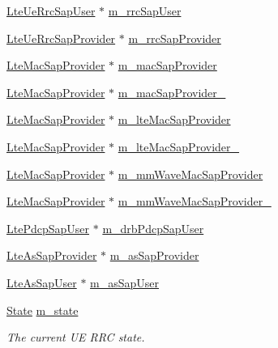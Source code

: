 \begin{DoxyCompactItemize}
\item 
\hyperlink{classns3_1_1LteUeRrcSapUser}{Lte\+Ue\+Rrc\+Sap\+User} $\ast$ \hyperlink{classns3_1_1LteUeRrc_a9636e38d20aa1d75c9423d43648f2a1a}{m\+\_\+rrc\+Sap\+User}
\item 
\hyperlink{classns3_1_1LteUeRrcSapProvider}{Lte\+Ue\+Rrc\+Sap\+Provider} $\ast$ \hyperlink{classns3_1_1LteUeRrc_a390a2ddfeab3abe021bbc35ad911d066}{m\+\_\+rrc\+Sap\+Provider}
\item 
\hyperlink{classns3_1_1LteMacSapProvider}{Lte\+Mac\+Sap\+Provider} $\ast$ \hyperlink{classns3_1_1LteUeRrc_a194a22ce682adab02b0e9d2fc71fda48}{m\+\_\+mac\+Sap\+Provider}
\item 
\hyperlink{classns3_1_1LteMacSapProvider}{Lte\+Mac\+Sap\+Provider} $\ast$ \hyperlink{classns3_1_1LteUeRrc_a78400536170ecae9893d5ae8c50bf069}{m\+\_\+mac\+Sap\+Provider\+\_}
\item 
\hyperlink{classns3_1_1LteMacSapProvider}{Lte\+Mac\+Sap\+Provider} $\ast$ \hyperlink{classns3_1_1LteUeRrc_a6eecd6eff45a1d5b9d783ffd1e5d099c}{m\+\_\+lte\+Mac\+Sap\+Provider}
\item 
\hyperlink{classns3_1_1LteMacSapProvider}{Lte\+Mac\+Sap\+Provider} $\ast$ \hyperlink{classns3_1_1LteUeRrc_a183748045145f6f225e4dd2d20e08dee}{m\+\_\+lte\+Mac\+Sap\+Provider\+\_}
\item 
\hyperlink{classns3_1_1LteMacSapProvider}{Lte\+Mac\+Sap\+Provider} $\ast$ \hyperlink{classns3_1_1LteUeRrc_ace6035d94d2a6fb838f107450d49b373}{m\+\_\+mm\+Wave\+Mac\+Sap\+Provider}
\item 
\hyperlink{classns3_1_1LteMacSapProvider}{Lte\+Mac\+Sap\+Provider} $\ast$ \hyperlink{classns3_1_1LteUeRrc_a0df418b8b1c9be4267f5b56d904ba841}{m\+\_\+mm\+Wave\+Mac\+Sap\+Provider\+\_}
\item 
\hyperlink{classns3_1_1LtePdcpSapUser}{Lte\+Pdcp\+Sap\+User} $\ast$ \hyperlink{classns3_1_1LteUeRrc_a6f2505a766e5a391d82170ebff83a9c2}{m\+\_\+drb\+Pdcp\+Sap\+User}
\item 
\hyperlink{classns3_1_1LteAsSapProvider}{Lte\+As\+Sap\+Provider} $\ast$ \hyperlink{classns3_1_1LteUeRrc_a8a7481a9bd77073e93fe21c545bd0a25}{m\+\_\+as\+Sap\+Provider}
\item 
\hyperlink{classns3_1_1LteAsSapUser}{Lte\+As\+Sap\+User} $\ast$ \hyperlink{classns3_1_1LteUeRrc_aef8b3b6b1b1527ce6946472d1c1888dc}{m\+\_\+as\+Sap\+User}
\item 
\hyperlink{classns3_1_1LteUeRrc_a241012c291e75681150c9214e11f6145}{State} \hyperlink{classns3_1_1LteUeRrc_a81d711739d758a5add38b100086be632}{m\+\_\+state}
\begin{DoxyCompactList}\small\item\em The current UE R\+RC state. \end{DoxyCompactList}\item 

\end{DoxyCompactItemize}
